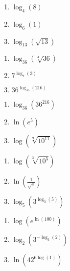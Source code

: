 \begin{multicols}{3}
\begin{enumerate}
\setcounter{enumi}{\value{HW}}

\item $\log_{4} (8)$
\item $\log_{6} (1)$
\item $\log_{13} \left(\sqrt{13}\right)$

\setcounter{HW}{\value{enumi}}
\end{enumerate}
\end{multicols}


\begin{multicols}{3}
\begin{enumerate}
\setcounter{enumi}{\value{HW}}

\item $\log_{36} \left(\sqrt[4]{36}\right)$
\item $7^{\log_{7} (3)}$
\item  $36^{\log_{36}(216)}$

\setcounter{HW}{\value{enumi}}
\end{enumerate}
\end{multicols}


\begin{multicols}{3}
\begin{enumerate}
\setcounter{enumi}{\value{HW}}

\item  $\log_{36} \left(36^{216}\right)$
\item $\ln \left(e^{5} \right)$
\item $\log \left(\sqrt[9]{10^{11}}\right)$

\setcounter{HW}{\value{enumi}}
\end{enumerate}
\end{multicols}


\begin{multicols}{3}
\begin{enumerate}
\setcounter{enumi}{\value{HW}}

\item  $\log\left( \sqrt[3]{10^5} \right)$
\item  $\ln \left( \frac{1}{\sqrt{e}}\right)$
\item $\log_{5} \left(3^{\log_{3} (5)}\right)$

\setcounter{HW}{\value{enumi}}
\end{enumerate}
\end{multicols}


\begin{multicols}{3}
\begin{enumerate}
\setcounter{enumi}{\value{HW}}

\item $\log\left(e^{\ln(100)}\right)$ 
\item $\log_{2}\left(3^{-\log_{3}(2)}\right)$
\item $\ln\left(42^{6\log(1)}\right)$ \label{simplifyloglast}

\setcounter{HW}{\value{enumi}}
\end{enumerate}
\end{multicols}

